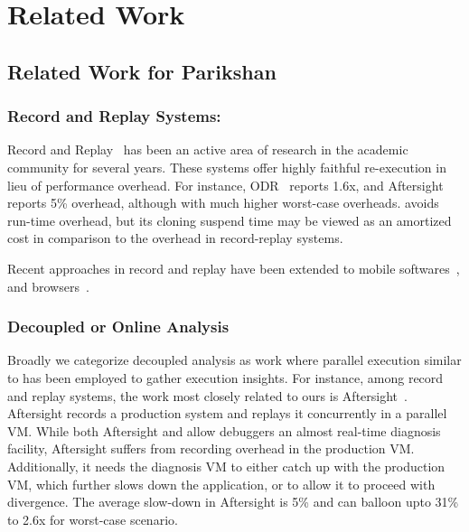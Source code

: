 \chapter{Related Work}

\section{Related Work for Parikshan}


\subsection{Record and Replay Systems:}  
Record and Replay~\cite{odr,revirt,guo2008r2,geels2007friday,doubleplay} has been an active area of research in the academic community for several years. 
These systems offer highly faithful re-execution in lieu of performance overhead. 
For instance, ODR~\cite{odr} reports 1.6x, and Aftersight~\cite{aftersight} reports 5\% overhead, although with much higher worst-case overheads.
\parikshan avoids run-time overhead, but its cloning suspend time may be viewed as an amortized cost in comparison to the overhead in record-replay systems.

Recent approaches in record and replay have been extended to mobile softwares~\cite{mobileReplay,MobiPlay}, and browsers~\cite{browserReplay}.


\subsection{Decoupled or Online Analysis}
\label{sec:relatedDecoupled}

Broadly we categorize decoupled analysis as work where parallel execution similar to \parikshan has been employed to gather execution insights.
For instance, among record and replay systems, the work most closely related to ours is Aftersight~\cite{aftersight}. 
Aftersight records a production system and replays it concurrently in a parallel VM.
While both Aftersight and \parikshan allow debuggers an almost real-time diagnosis facility, Aftersight suffers from recording overhead in the production VM.
Additionally, it needs the diagnosis VM to either catch up with the production VM, which further slows down the application, or to allow it to proceed with divergence.
The average slow-down in Aftersight is 5\% and can balloon upto 31\% to 2.6x for worst-case scenario.

